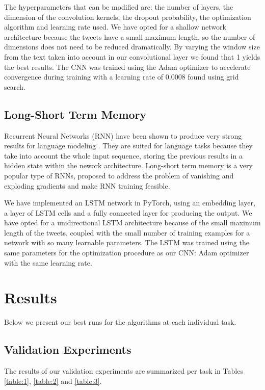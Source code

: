 \documentclass[11pt,a4paper]{article}
\begin{document}
The hyperparameters that can be modified are: the number of layers, the dimension of the convolution kernels, the dropout probability, the optimization algorithm and learning rate used. We have opted for a shallow network architecture because the tweets have a small maximum length, so the number of dimensions does not need to be reduced dramatically. By varying the window size from the text taken into account in our convolutional layer we found that 1 yields the best results. The CNN was trained using the Adam optimizer \cite{adam} to accelerate convergence during training with a learning rate of 0.0008 found using grid search.

\subsection{Long-Short Term Memory}

Recurrent Neural Networks (RNN) have been shown to produce very strong results for language modeling \cite{model}. 
They are suited for language tasks because they take into account the whole input sequence, storing the previous results in a hidden state within the nework architecture. Long-short term memory \cite{lstm} is a very popular type of RNNs, proposed to address the problem of vanishing and exploding gradients and make RNN training feasible.

We have implemented an LSTM network in PyTorch, using an embedding layer, a layer of LSTM cells and a fully connected layer for producing the output. We have opted for a unidirectional LSTM architecture because of the small maximum length of the tweets, coupled with the small number of training examples for a network with so many learnable parameters. The LSTM was trained using the same parameters for the optimization procedure as our CNN: Adam optimizer with the same learning rate.

\section{Results}

Below we present our best runs for the algorithms at each individual task.

\subsection{Validation Experiments}

The results of our validation experiments are summarized per task in Tables \ref{table:1}, \ref{table:2} and \ref{table:3}.
\end{document}
